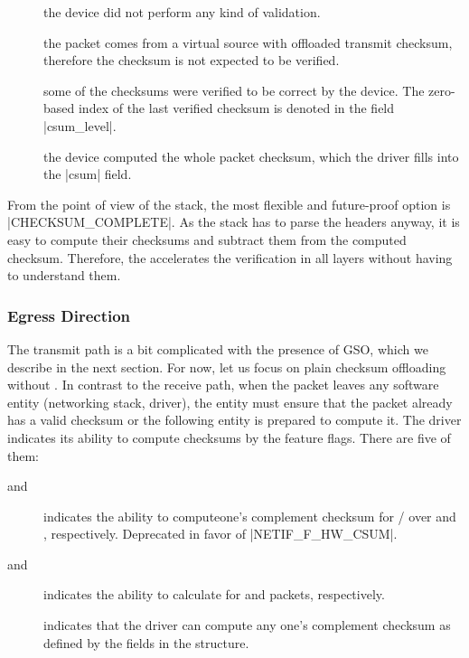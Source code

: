 \begin{description}
	\item[] the device did not perform any kind of
		validation.
	\item[] the packet comes from a virtual source
		with offloaded transmit checksum, therefore the checksum is not
		expected to be verified.
	\item[] some of the checksums were verified to
		be correct by the device. The zero-based index of the last verified
		checksum is denoted in the field \field|csum_level|.
	\item[] the device computed the whole packet
		checksum, which the driver fills into the \field|csum| field.
\end{description}

From the point of view of the stack, the most flexible and future-proof option
is \macro|CHECKSUM_COMPLETE|. As the stack has to parse the headers anyway, it
is easy to compute their checksums and subtract them from the computed
checksum. Therefore, the  accelerates the verification in all layers without
having to understand them.
\label{tag:linux-rxcsum}

\subsubsection{Egress Direction}

The transmit path is a bit complicated with the presence of \acrfull{GSO}, which we
describe in the next section. For now, let us focus on plain checksum
offloading without . In contrast to the receive path, when the packet
leaves any software entity (networking stack, driver), the entity must ensure
that the packet already has a valid checksum or the following entity is
prepared to compute it. The driver indicates its ability to compute checksums
by the feature flags. There are five of them:

\begin{description}
	\item[ and ]
		indicates the ability to compute\break one's complement checksum for
		/ over  and , respectively. Deprecated in
		favor of \macro|NETIF_F_HW_CSUM|.
	\item[ and ]
		indicates the ability to calculate  for  and  packets,
		respectively.
	\item[]
		indicates that the driver can compute any one's complement checksum as
		defined by the fields in the \skb{} structure.
\end{description}

